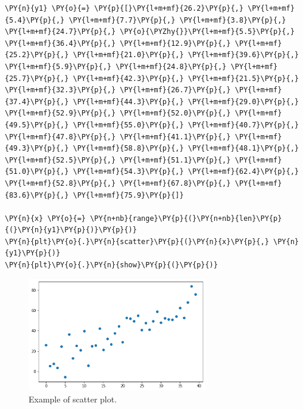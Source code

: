 \begin{tcolorbox}[breakable, size=fbox, boxrule=1pt, pad at break*=1mm,colback=cellbackground, colframe=cellborder]
\begin{Verbatim}[commandchars=\\\{\}]
\PY{n}{y1} \PY{o}{=} \PY{p}{[}\PY{l+m+mf}{26.2}\PY{p}{,} \PY{l+m+mf}{5.4}\PY{p}{,} \PY{l+m+mf}{7.7}\PY{p}{,} \PY{l+m+mf}{3.8}\PY{p}{,} \PY{l+m+mf}{24.7}\PY{p}{,} \PY{o}{\PYZhy{}}\PY{l+m+mf}{5.5}\PY{p}{,} \PY{l+m+mf}{36.4}\PY{p}{,} \PY{l+m+mf}{12.9}\PY{p}{,} \PY{l+m+mf}{25.2}\PY{p}{,} \PY{l+m+mf}{21.0}\PY{p}{,} \PY{l+m+mf}{39.6}\PY{p}{,} 
\PY{l+m+mf}{5.9}\PY{p}{,} \PY{l+m+mf}{24.8}\PY{p}{,} \PY{l+m+mf}{25.7}\PY{p}{,} \PY{l+m+mf}{42.3}\PY{p}{,} \PY{l+m+mf}{21.5}\PY{p}{,} \PY{l+m+mf}{32.3}\PY{p}{,} \PY{l+m+mf}{26.7}\PY{p}{,} \PY{l+m+mf}{37.4}\PY{p}{,} \PY{l+m+mf}{44.3}\PY{p}{,} \PY{l+m+mf}{29.0}\PY{p}{,} 
\PY{l+m+mf}{52.9}\PY{p}{,} \PY{l+m+mf}{52.0}\PY{p}{,} \PY{l+m+mf}{49.5}\PY{p}{,} \PY{l+m+mf}{55.0}\PY{p}{,} \PY{l+m+mf}{40.7}\PY{p}{,} \PY{l+m+mf}{47.8}\PY{p}{,} \PY{l+m+mf}{41.1}\PY{p}{,} \PY{l+m+mf}{49.3}\PY{p}{,} \PY{l+m+mf}{58.8}\PY{p}{,} \PY{l+m+mf}{48.1}\PY{p}{,} 
\PY{l+m+mf}{52.5}\PY{p}{,} \PY{l+m+mf}{51.1}\PY{p}{,} \PY{l+m+mf}{51.0}\PY{p}{,} \PY{l+m+mf}{54.3}\PY{p}{,} \PY{l+m+mf}{62.4}\PY{p}{,} \PY{l+m+mf}{52.8}\PY{p}{,} \PY{l+m+mf}{67.8}\PY{p}{,} \PY{l+m+mf}{83.6}\PY{p}{,} \PY{l+m+mf}{75.9}\PY{p}{]}
	
\PY{n}{x} \PY{o}{=} \PY{n+nb}{range}\PY{p}{(}\PY{n+nb}{len}\PY{p}{(}\PY{n}{y1}\PY{p}{)}\PY{p}{)}
\PY{n}{plt}\PY{o}{.}\PY{n}{scatter}\PY{p}{(}\PY{n}{x}\PY{p}{,} \PY{n}{y1}\PY{p}{)}
\PY{n}{plt}\PY{o}{.}\PY{n}{show}\PY{p}{(}\PY{p}{)}
\end{Verbatim}
\end{tcolorbox}

\begin{figure}[htb]
	\centering
	\includegraphics[width=0.7\textwidth]{figures/scatter}
	\caption{Example of scatter plot.}
	\label{fig:scatter}
\end{figure}


